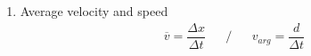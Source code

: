 \documentclass[12pt,a4paper]{report}
\begin{document}
{\begin{center}
\begin{enumerate}
\begin{itemize}
                \begin{equation} \label{eu_eqn}
					\Delta x = x - x_{0}   		
         		\end{equation}
				\begin{center}
				$\Delta x$ is displacement, $x$ is the final position, $x_{0}$ is the initial position.
				\\
				Displacement is the difference between the final and initial positions.
				\end{center}				         		
         		
                
            \end{itemize}
            
   		\item Average velocity and speed
   			\begin{align*}
   				\overline{v} = \dfrac{\Delta x}{\Delta t} && / && v_{arg} = \dfrac{d}{\Delta t}
   			\end{align*}
   		
               
        \newpage

   		
            
    \end{enumerate}


\end{center}}
\end{document}

